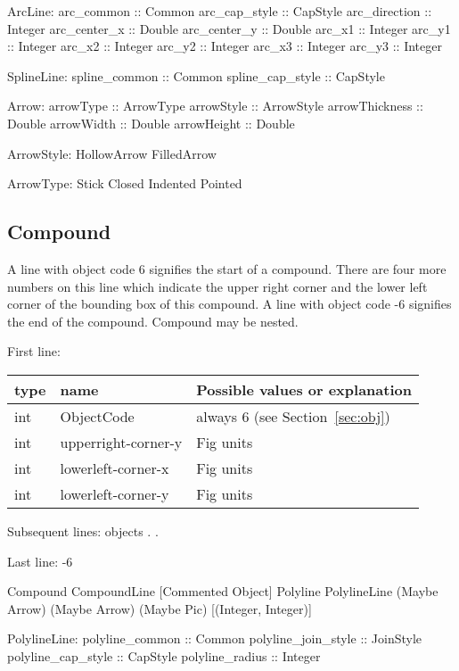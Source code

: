 \documentclass[10pt, a4paper]{article}
\begin{document}
ArcLine:
arc\_common :: Common
arc\_cap\_style :: CapStyle
arc\_direction :: Integer
arc\_center\_x :: Double
arc\_center\_y :: Double
arc\_x1 :: Integer
arc\_y1 :: Integer
arc\_x2 :: Integer
arc\_y2 :: Integer
arc\_x3 :: Integer
arc\_y3 :: Integer

SplineLine:
spline\_common :: Common
spline\_cap\_style :: CapStyle

Arrow:
arrowType :: ArrowType
arrowStyle :: ArrowStyle
arrowThickness :: Double
arrowWidth :: Double
arrowHeight :: Double


ArrowStyle:
HollowArrow	 
FilledArrow	 


ArrowType:
Stick	 
Closed	 
Indented	 
Pointed	 


 
\subsection{Compound}\label{subsec:compound}


A line with object code 6 signifies the start of a compound.
    There are four more numbers on this line which indicate the
    upper right corner and the lower left corner of the bounding
    box of this compound.  A line with object code -6 signifies
    the end of the compound.  Compound may be nested.

   First line:

\begin{tabular}{|lll|}
\hline
type & name & Possible values or explanation \\
\hline
\hline
int & ObjectCode             & always 6 (see Section~\ref{sec:obj}) \\
int & upperright-corner-y     & Fig units \\
int & lowerleft-corner-x      & Fig units \\
int & lowerleft-corner-y      & Fig units \\
\hline
\end{tabular}

 Subsequent lines:
        objects
        .
        .

    Last line:
        -6

Compound CompoundLine [Commented Object]	 
Polyline PolylineLine (Maybe Arrow) (Maybe Arrow) (Maybe Pic) [(Integer, Integer)]	 



PolylineLine:
polyline\_common :: Common
polyline\_join\_style :: JoinStyle
polyline\_cap\_style :: CapStyle
polyline\_radius :: Integer
\end{document}
